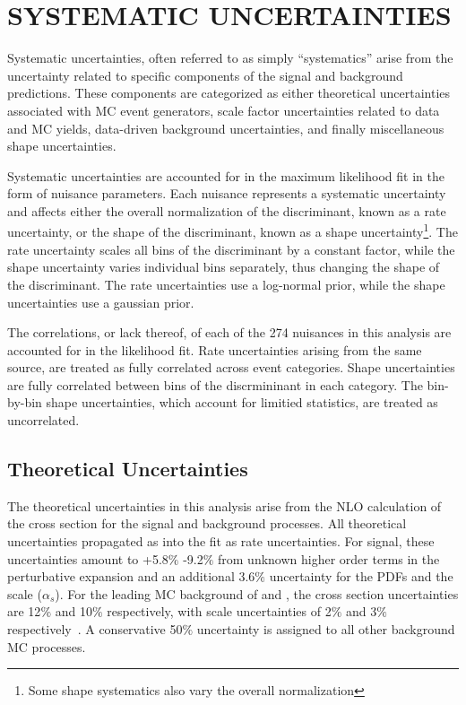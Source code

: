 %
%

\chapter{SYSTEMATIC UNCERTAINTIES}
Systematic uncertainties, often referred to as simply ``systematics'' arise from the uncertainty related to specific components of the signal
and background predictions. These components are categorized as either theoretical uncertainties associated with MC event generators, scale factor uncertainties
related to data and MC yields, data-driven background uncertainties, and finally miscellaneous shape uncertainties.  

Systematic uncertainties are accounted for in the maximum likelihood fit in the form of nuisance parameters. Each nuisance represents a systematic uncertainty
and affects either the overall normalization of the discriminant, known as a rate uncertainty, or the shape of the discriminant,
known as a shape uncertainty\footnote{Some shape systematics also vary the overall normalization}. The rate uncertainty scales all bins of the discriminant
by a constant factor, while the shape uncertainty varies individual bins separately, thus changing the shape of the discriminant.
The rate uncertainties use a log-normal prior, while the shape uncertainties use a gaussian prior. 

The correlations, or lack thereof, of each of the 274 nuisances in this analysis are accounted for in the likelihood fit. 
Rate uncertainties arising from the same source, are treated as fully correlated across event categories. Shape uncertainties are fully correlated between
bins of the discrmininant in each category. The bin-by-bin shape uncertainties, which account for limitied statistics, are treated as uncorrelated. 


\section{Theoretical Uncertainties}
The theoretical uncertainties in this analysis arise from the NLO calculation of the cross section for the signal and background processes.
All theoretical uncertainties propagated as into the fit as rate uncertainties. For \tth signal,
these uncertainties amount to +5.8$\%$ -9.2$\%$ from unknown higher order terms in the perturbative expansion and an additional 3.6$\%$ uncertainty for the
PDFs and the scale ($\alpha_{s}$). For the leading MC background of \ttw and \ttz, the cross section uncertainties are 12$\%$ and 10$\%$ respectively, with
scale uncertainties of 2$\%$ and 3$\%$ respectively~\cite{xsec_uncert}. A conservative 50$\%$ uncertainty is assigned to all other background MC processes. 

